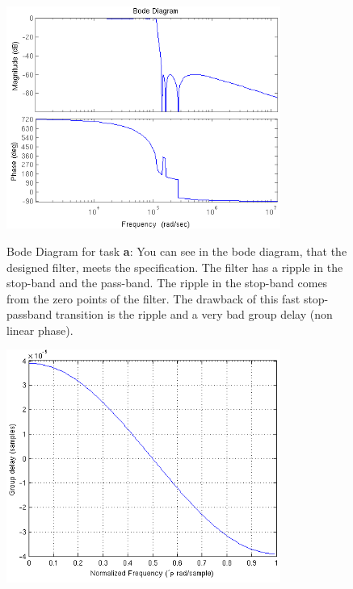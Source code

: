 \begin{figure}[h!]
 \centering
 \includegraphics[width=0.8\textwidth]{./pics/2_a_bode.png}
 \label{fig:2_a_bode}
 \caption{Bode Diagram for task \textbf{a}: You can see in the bode diagram, that the designed filter, meets the specification.
 The filter has a ripple in the stop-band and the pass-band. The ripple in the stop-band comes from
 the zero points of the filter. The drawback of this fast stop-passband transition is the ripple
 and a very bad group delay (non linear phase).}
\end{figure}

\begin{figure}[h!]
 \centering
 \includegraphics[width=0.8\textwidth]{./pics/2_a_grpdelay.png}
 \label{fig:2_a_grpdelay}
\end{figure}

